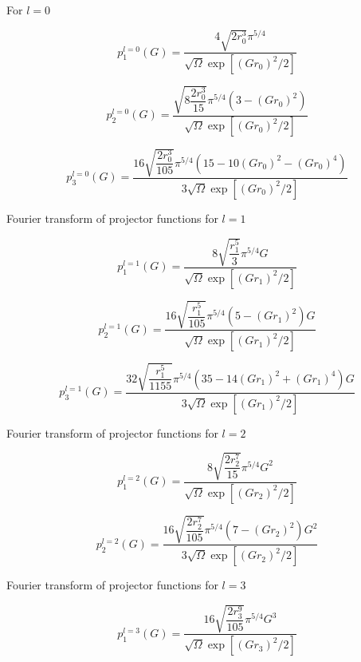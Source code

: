 For $l = 0$

\begin{equation}
p^{l=0}_{1}(G) = \dfrac
{4\sqrt{2r_0^3}\pi^{5/4}}
{\sqrt{\Omega}\exp\left[(Gr_0)^2/2\right]}
\end{equation}

\begin{equation}
p^{l=0}_{2}(G) = \dfrac
{\sqrt{8\dfrac{2r_0^3}{15}}\pi^{5/4}
\left( 3-(Gr_0)^2 \right)}
{\sqrt{\Omega}\exp\left[(Gr_0)^2/2\right]}
\end{equation}

\begin{equation}
p^{l=0}_{3}(G) = \dfrac
{16\sqrt{\dfrac{2r_0^3}{105}}\pi^{5/4}
\left(15 - 10(Gr_0)^2 - (Gr_0)^4 \right)}
{3\sqrt{\Omega}\exp\left[(Gr_0)^2/2\right]}
\end{equation}

Fourier transform of projector functions for $l=1$

\begin{equation}
p^{l=1}_{1}(G) = \dfrac
{8\sqrt{\dfrac{r_1^5}{3}}\pi^{5/4}G}
{\sqrt{\Omega}\exp\left[(Gr_1)^2/2\right]}
\end{equation}

\begin{equation}
p^{l=1}_{2}(G) = \dfrac
{16\sqrt{\dfrac{r_1^5}{105}}\pi^{5/4}
\left( 5 - (Gr_1)^2 \right)G}
{\sqrt{\Omega}\exp\left[(Gr_1)^2/2\right]}
\end{equation}

\begin{equation}
p^{l=1}_{3}(G) = \dfrac
{32\sqrt{\dfrac{r_1^5}{1155}}\pi^{5/4}
\left( 35 - 14(Gr_1)^2 + (Gr_1)^4 \right)G}
{3\sqrt{\Omega}\exp\left[(Gr_1)^2/2\right]}
\end{equation}

Fourier transform of projector functions for $l=2$

\begin{equation}
p^{l=2}_{1}(G) = \dfrac
{8\sqrt{\dfrac{2r_2^7}{15}}\pi^{5/4}G^2}
{\sqrt{\Omega}\exp\left[(Gr_2)^2/2\right]}
\end{equation}

\begin{equation}
p^{l=2}_{2}(G) = \dfrac
{16\sqrt{\dfrac{2r_2^7}{105}}\pi^{5/4}
\left( 7 - (Gr_2)^2 \right)G^2}
{3\sqrt{\Omega}\exp\left[(Gr_2)^2/2\right]}
\end{equation}

Fourier transform of projector functions for $l=3$

\begin{equation}
p^{l=3}_{1}(G) = \dfrac
{16\sqrt{\dfrac{2r_3^9}{105}}\pi^{5/4}G^3}
{\sqrt{\Omega}\exp\left[(Gr_3)^2/2\right]}
\end{equation}


